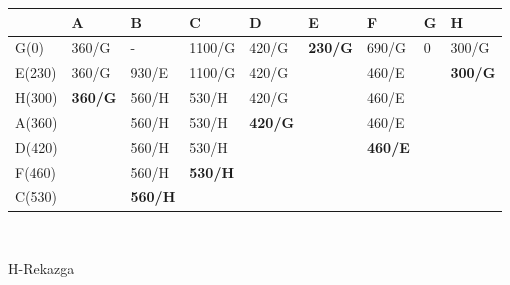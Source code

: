 \documentclass[12pt]{article}
\begin{document}
\begin{enumerate}
\begin{center}
\begin{tabular}{|l|l|l|llllll}
\hline
 & A & B & \multicolumn{1}{l|}{C} & \multicolumn{1}{l|}{D} & \multicolumn{1}{l|}{E} & \multicolumn{1}{l|}{F} & \multicolumn{1}{l|}{G} & \multicolumn{1}{l|}{H} \\ \hline
G(0) & 360/G & - & \multicolumn{1}{l|}{1100/G} & \multicolumn{1}{l|}{420/G} & \multicolumn{1}{l|}{\textbf{230/G}} & \multicolumn{1}{l|}{690/G} & \multicolumn{1}{l|}{0} & \multicolumn{1}{l|}{300/G} \\ \hline
E(230) & 360/G & 930/E & \multicolumn{1}{l|}{1100/G} & \multicolumn{1}{l|}{420/G} & \multicolumn{1}{l|}{} & \multicolumn{1}{l|}{460/E} & \multicolumn{1}{l|}{} & \multicolumn{1}{l|}{\textbf{300/G}} \\ \cline{1-5} \cline{7-7} \cline{9-9} 
H(300) & \textbf{360/G} & 560/H & \multicolumn{1}{l|}{530/H} & \multicolumn{1}{l|}{420/G} & \multicolumn{1}{l|}{} & \multicolumn{1}{l|}{460/E} &  &  \\ \cline{1-5} \cline{7-7}
A(360) &  & 560/H & \multicolumn{1}{l|}{530/H} & \multicolumn{1}{l|}{\textbf{420/G}} & \multicolumn{1}{l|}{} & \multicolumn{1}{l|}{460/E} &  &  \\ \cline{1-1} \cline{3-5} \cline{7-7}
D(420) &  & 560/H & \multicolumn{1}{l|}{530/H} &  & \multicolumn{1}{l|}{} & \multicolumn{1}{l|}{\textbf{460/E}} & \textbf{} &  \\ \cline{1-1} \cline{3-4} \cline{7-7}
F(460) &  & 560/H & \multicolumn{1}{l|}{\textbf{530/H}} &  &  &  &  &  \\ \cline{1-1} \cline{3-4}
C(530) & \textbf{} & \textbf{560/H} &  &  &  & \textbf{} &  &  \\ \cline{1-1} \cline{3-3}
\end{tabular}
\\
      \vspace{0.5cm}
      
             H-Rekazga
             

\end{center}
\end{enumerate}
\end{document}
